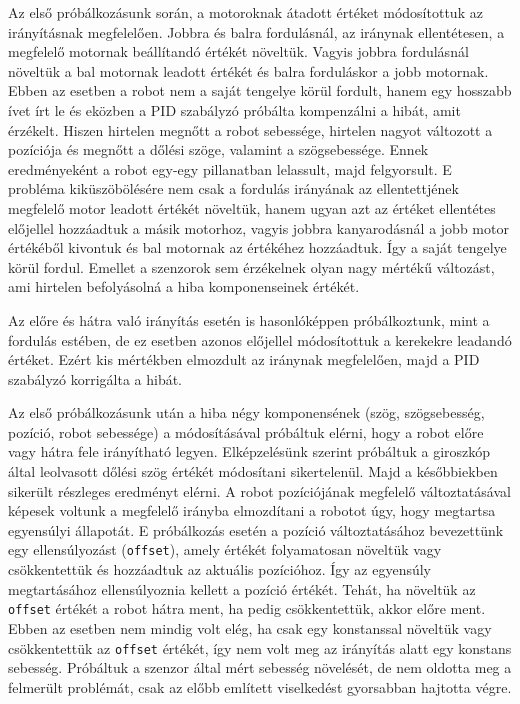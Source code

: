 Az első próbálkozásunk során, a motoroknak átadott értéket módosítottuk az irányításnak megfelelően. Jobbra és balra fordulásnál, az iránynak ellentétesen, a megfelelő motornak beállítandó értékét növeltük. Vagyis jobbra fordulásnál növeltük a bal motornak leadott értékét és balra forduláskor a jobb motornak. Ebben az esetben a robot nem a saját tengelye körül fordult, hanem egy hosszabb ívet írt le és eközben a PID szabályzó próbálta kompenzálni a hibát, amit érzékelt. Hiszen hirtelen megnőtt a robot sebessége, hirtelen nagyot változott a pozíciója és megnőtt a dőlési szöge, valamint a szögsebessége. Ennek eredményeként a robot egy-egy pillanatban lelassult, majd felgyorsult. E probléma kiküszöbölésére nem csak a fordulás irányának az ellentettjének megfelelő motor leadott értékét növeltük, hanem ugyan azt az értéket ellentétes előjellel hozzáadtuk a másik motorhoz, vagyis jobbra kanyarodásnál a jobb motor értékéből kivontuk és bal motornak az értékéhez hozzáadtuk. Így a saját tengelye körül fordul. Emellet a szenzorok sem érzékelnek olyan nagy mértékű változást, ami hirtelen befolyásolná a hiba komponenseinek értékét.

Az előre és hátra való irányítás esetén is hasonlóképpen próbálkoztunk, mint a fordulás estében, de ez esetben azonos előjellel módosítottuk a kerekekre leadandó értéket. Ezért kis mértékben elmozdult az iránynak megfelelően, majd a PID szabályzó korrigálta a hibát.

Az első próbálkozásunk után a hiba négy komponensének (szög, szögsebesség, pozíció, robot sebessége) a módosításával próbáltuk elérni, hogy a robot előre vagy hátra fele irányítható legyen. Elképzelésünk szerint próbáltuk a giroszkóp által leolvasott dőlési szög értékét módosítani sikertelenül. Majd a későbbiekben sikerült részleges eredményt elérni. A robot pozíciójának megfelelő változtatásával képesek voltunk a megfelelő irányba elmozdítani a robotot úgy, hogy megtartsa egyensúlyi állapotát. E próbálkozás esetén a pozíció változtatásához bevezettünk egy ellensúlyozást (\texttt{offset}), amely értékét folyamatosan növeltük vagy csökkentettük és hozzáadtuk az aktuális pozícióhoz. Így az egyensúly megtartásához ellensúlyoznia kellett a pozíció értékét. Tehát, ha növeltük az \texttt{offset} értékét a robot hátra ment, ha pedig csökkentettük, akkor előre ment. Ebben az esetben nem mindig volt elég, ha csak egy konstanssal növeltük vagy csökkentettük az \texttt{offset} értékét, így nem volt meg az irányítás alatt egy konstans sebesség. Próbáltuk a szenzor által mért sebesség növelését, de nem oldotta meg a felmerült problémát, csak az előbb említett viselkedést gyorsabban hajtotta végre.

